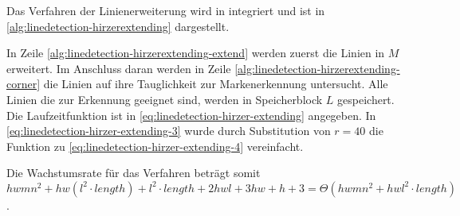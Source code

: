 Das Verfahren der Linienerweiterung wird in  integriert und ist in
 \autoref{alg:linedetection-hirzerextending} dargestellt.

In Zeile \ref{alg:linedetection-hirzerextending-extend} werden zuerst die Linien in $M$ erweitert. Im Anschluss daran
 werden in Zeile \ref{alg:linedetection-hirzerextending-corner} die Linien auf ihre Tauglichkeit zur Markenerkennung
 untersucht. Alle Linien die zur Erkennung geeignet sind, werden in Speicherblock $L$ gespeichert. Die Laufzeitfunktion
 ist in \autoref{eq:linedetection-hirzer-extending} angegeben. In \autoref{eq:linedetection-hirzer-extending-3} wurde
 durch Substitution von  $r = 40$ die Funktion zu \autoref{eq:linedetection-hirzer-extending-4} vereinfacht.

Die Wachstumsrate für das Verfahren beträgt somit
$hwmn^2 + hw(l^2\cdot\mathit{length}) + l^2\cdot\mathit{length} + 2hwl + 3hw + h + 3
 = \Theta(hwmn^2 + hwl^2\cdot\mathit{length})$.
